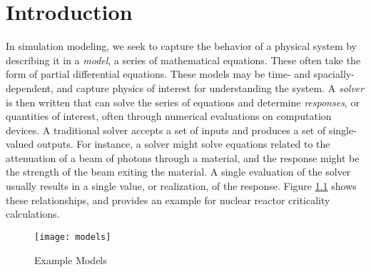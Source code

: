 
\chapter{Introduction} %

\label{ch:intro} %




In simulation modeling, we seek to capture the behavior of a physical system by describing it in a
\emph{model}, a series
of mathematical equations.  These often take the form of partial differential equations.  These models may be
time- and spacially-dependent, and capture
physics of interest for understanding the system.  A \emph{solver} is then written that can solve the series
of equations and determine \emph{responses}, or quantities of interest, often through numerical evaluations on
computation devices.  A traditional solver accepts a set of inputs and
produces a set of single-valued outputs.  For instance, a solver might solve equations related to the
attenuation of a beam of photons through a material, and the response might be the strength of the beam exiting the
material.  A single evaluation of the solver usually results in a single value, or realization, of the
response.  Figure \ref{fig:model} shows these relationships, and provides an example for nuclear reactor criticality 
calculations.
\begin{figure}[H]
  \centering
  \texttt{[image: models]}
  \caption{Example Models}
  \label{fig:model}
\end{figure}

